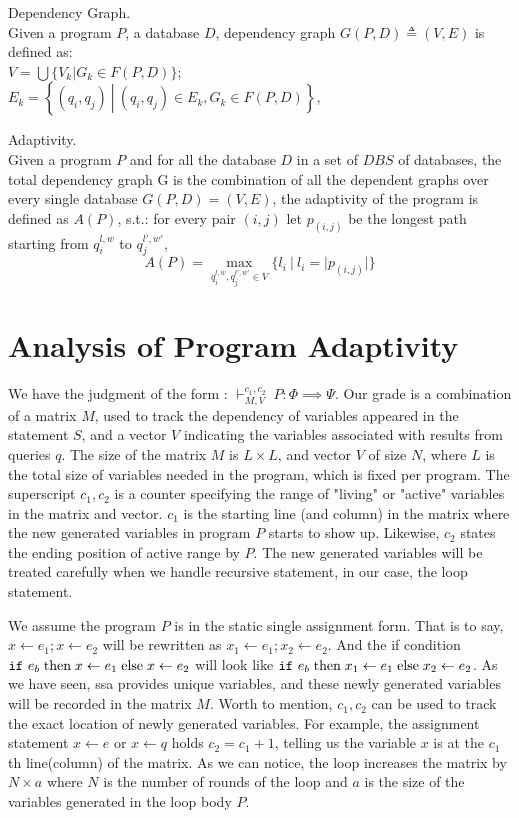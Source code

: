 \documentclass[a4paper,11pt]{article}
\begin{document}
\begin{defn}
Dependency Graph.
\\
Given a program $P$, a database $D$, 
dependency graph $G(P, D) \triangleq (V, E)$ is defined as: 
\\
$V =\bigcup \{V_k | G_k \in F(P, D)  \}$;
\\
$E_k = \left\{(q_i,q_j) 
~ \left \vert ~ (q_i,q_j) \in E_k , G_k \in F(P, D) \right.\right\}$,
\end{defn}
%
%
\begin{defn}
Adaptivity.
\\
Given a program $P$ and for all the database $D$ in a set of $DBS$ of databases, the total dependency graph G is the combination of all the dependent graphs over every single database $G(P, D) = (V, E)$, the adaptivity of the program is defined as $A(P)$, s.t.:
for every pair $(i,j)$ let $p_{(i,j)}$ be the longest path starting from $q_i^{l, w}$ to $q_j^{l',w'}$,
%
$$A(P) = \max\limits_{q_i^{l,w},q_j^{l',w'} \in V }\{l_i ~|~ l_i = |p_(i,j)| \}$$
\end{defn}
%
%
\section{Analysis of Program Adaptivity}
We have the judgment of the form : $\vdash^{c_1, c_2}_{M,V} ~ P : \Phi \implies \Psi$.  Our grade is a combination of a matrix $M$, used to track the dependency of variables appeared in the statement $S$, and a vector $V$ indicating the variables associated with results from queries $q$. The size of the matrix $M$ is $L \times L$, and vector $V$ of size $N$, where $L$ is the total size of variables needed in the program, which is fixed per program. 
The superscript $c_1,c_2$ is a counter specifying the range of "living" or "active" variables in the matrix and vector. $c_1$ is the starting line (and column) in the matrix where the new generated variables  in program $P$ starts to show up. Likewise, $c_2$ states the ending position of active range by $P$. The new generated variables will be treated carefully when we handle recursive statement, in our case, the loop statement. 

We assume the program $P$ is in the static single assignment form. That is to say, $x \leftarrow e_1; x \leftarrow e_2 $ will be rewritten as $ x_1 \leftarrow e_1; x_2 \leftarrow e_2$. And the if condition $ \mathtt{if} ~ e_b \mbox{\;then\;} x \leftarrow e_1 \mbox{\;else\;} x \leftarrow e_2  $ will look like $ \mathtt{if} ~ e_b \mbox{\;then\;} x_1 \leftarrow e_1 \mbox{\;else\;} x_2 \leftarrow e_2  $. As we have seen, ssa provides unique variables, and these newly generated variables will be recorded in the matrix $M$. Worth to mention, $c_1,c_2$ can be used to track the exact location of newly generated variables. For example, the assignment statement $x \leftarrow e$ or $x \leftarrow q $ holds $c_2 =c_1+1$, telling us the variable $x$ is at the $c_1$th line(column) of the matrix. As we can notice, the loop increases the matrix by $N \times a$ where $N$ is the number of rounds of the loop and $a$ is the size of the variables generated in the loop body $P$.
\end{document}
